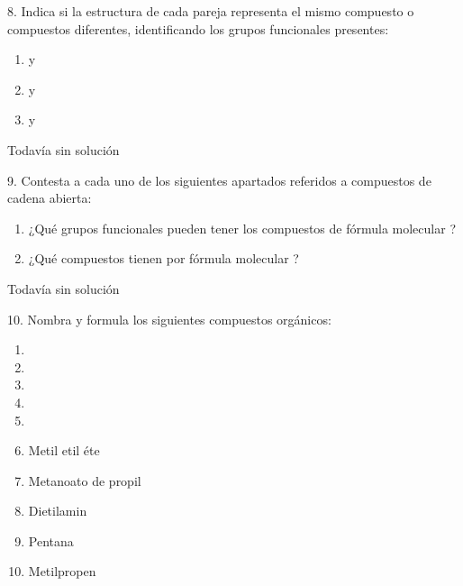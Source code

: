 \documentclass{article}
\begin{document}
\begin{exercise}
  8. Indica si la estructura de cada pareja representa el mismo
  compuesto o compuestos diferentes, identificando los grupos
  funcionales presentes:
  \begin{enumerate}
    \item {} y 
    \item {} y 
    \item {} y 
  \end{enumerate}
\end{exercise}

\begin{solution}[print=false]
  Todavía sin solución
\end{solution}

\begin{exercise}
  9. Contesta a cada uno de los siguientes apartados referidos a
  compuestos de cadena abierta:
  \begin{enumerate}
    \item ¿Qué grupos funcionales pueden tener los compuestos de
    fórmula molecular ?
    \item ¿Qué compuestos tienen por fórmula molecular ?
  \end{enumerate}
\end{exercise}

\begin{solution}[print=false]
  Todavía sin solución
\end{solution}

\begin{exercise}
  10. Nombra y formula los siguientes compuestos orgánicos:
  \begin{enumerate}
    \item {}
    \item {}
    \item {}
    \item {}
    \item {}
    \item Metil etil éte
    \item Metanoato de propil
    \item Dietilamin
    \item Pentana
    \item Metilpropen
  \end{enumerate}
\end{exercise}
\end{document}
